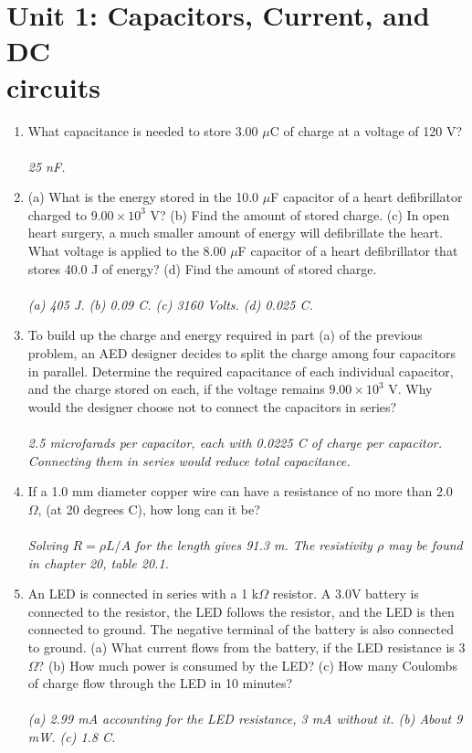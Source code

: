\documentclass[12pt,twocolumn]{article}
\begin{document}
\section{Unit 1: Capacitors, Current, and DC \\ circuits}

\noindent
\begin{enumerate}
\item What capacitance is needed to store 3.00 $\mu$C of charge at a voltage of 120 V? \\ \\ \textit{25 nF.}
\item (a) What is the energy stored in the 10.0 $\mu$F capacitor of a heart defibrillator charged to $9.00\times 10^3$ V? (b) Find the amount of stored charge. (c) In open heart surgery, a much smaller amount of energy will defibrillate the heart.  What voltage is applied to the 8.00 $\mu$F capacitor of a heart defibrillator that stores 40.0 J of energy? (d) Find the amount of stored charge. \\ \\
\textit{(a) 405 J. (b) 0.09 C. (c) 3160 Volts.  (d) 0.025 C.}
\item To build up the charge and energy required in part (a) of the previous problem, an AED designer decides to split the charge among four capacitors in parallel.  Determine the required capacitance of each individual capacitor, and the charge stored on each, if the voltage remains $9.00 \times 10^3$ V.  Why would the designer choose not to connect the capacitors in series? \\ \\
\textit{2.5 microfarads per capacitor, each with 0.0225 C of charge per capacitor.  Connecting them in series would reduce total capacitance.}
\item If a 1.0 mm diameter copper wire can have a resistance of no more than 2.0 $\Omega$, (at 20 degrees C), how long can it be? \\ \\
\textit{Solving $R = \rho L/A$ for the length gives 91.3 m.  The resistivity $\rho$ may be found in chapter 20, table 20.1.}
\item An LED is connected in series with a 1 k$\Omega$ resistor.  A 3.0V battery is connected to the resistor, the LED follows the resistor, and the LED is then connected to ground.  The negative terminal of the battery is also connected to ground.  (a) What current flows from the battery, if the LED resistance is $3$ $\Omega$? (b) How much power is consumed by the LED? (c) How many Coulombs of charge flow through the LED in 10 minutes? \\ \\
\textit{(a) 2.99 mA accounting for the LED resistance, 3 mA without it. (b) About 9 mW.  (c) 1.8 C.}
\end{enumerate}
\end{document}
